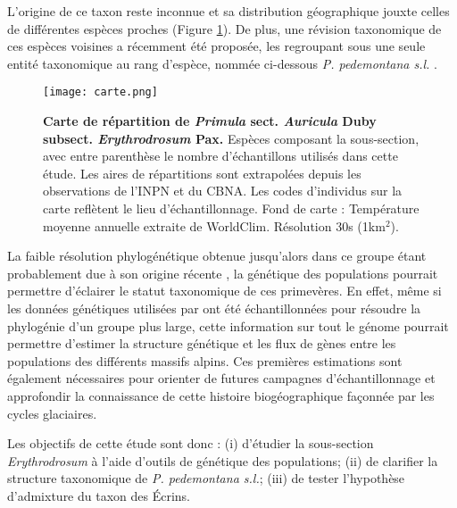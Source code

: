 \documentclass[../Master_report2.tex]{subfiles}
\begin{document}
L'origine de ce taxon reste inconnue et sa distribution géographique jouxte celles de dif\-férentes espèces proches (Figure \ref{carte}). De plus, une révision taxonomique de ces espèces voisines a récem\-ment été proposée, les regroupant sous une seule entité taxonomique au rang d'espèce, nommée ci-dessous \textit{P. pedemontana s.l.} \citep{Boucher2016a}. 

\begin{figure}[!ht]
    \centering
    \texttt{[image: carte.png]}
    \caption{\textbf{Carte de répartition de \textit{Primula} sect. \textit{Auricula} Duby subsect. \textit{Erythrodrosum} Pax.} Espèces composant la sous-section, avec entre parenthèse le nombre d'échantillons utilisés dans cette étude. Les aires de répartitions sont extrapolées depuis les observations de l'INPN et du CBNA. Les codes d'individus sur la carte reflètent le lieu d'échantillonnage. Fond de carte : Température moyenne annuelle extraite de WorldClim. Résolution 30s (1km$^{2}$).}
    \label{carte}
    \centering
\end{figure} 

La faible résolution phylogénétique obtenue jusqu'alors dans ce groupe étant probablement due à son origine récente \citep{Boucher2016} , la génétique des populations pourrait permettre d'éclairer le statut taxonomique de ces primevères. En effet, même si les données génétiques utilisées par \citet{Boucher2016a} ont été échantillonnées pour résoudre la phylogénie d'un groupe plus large, cette information sur tout le génome pourrait permettre d'estimer la structure génétique et les flux de gènes entre les populations des différents massifs alpins. Ces premières estimations sont également nécessaires pour orienter de futures campagnes d'échantillonnage et approfondir la connaissance de cette histoire biogéographique façonnée par les cycles glaciaires. 

Les objectifs de cette étude sont donc : (i) d'étudier la sous-section \textit{Erythrodrosum} à l'aide d'outils de génétique des populations; (ii) de clarifier la structure taxonomique de \textit{P. pedemontana s.l.}; (iii) de tester l'hypothèse d'admixture du taxon des Écrins.
\end{document}
